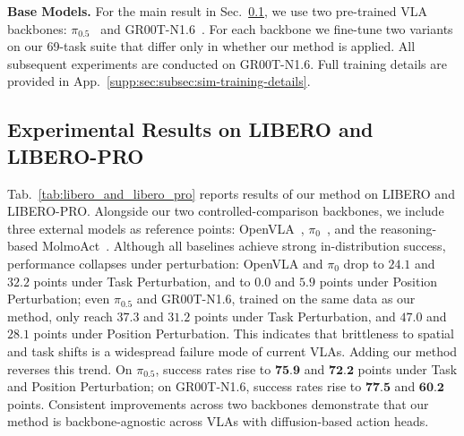 \noindent\textbf{Base Models.}
For the main result in Sec.~\ref{sec:libero_and_libero_pro}, we use two pre-trained VLA backbones:  $\pi_{0.5}$~\cite{pi05} and GR00T-N1.6~\cite{gr00tn1_2025}. For each backbone we fine-tune two variants on our 69-task suite that differ only in whether our method is applied. All subsequent experiments are conducted on GR00T-N1.6. Full training details are provided in App.~\ref{supp:sec:subsec:sim-training-details}.


\subsection{Experimental Results on LIBERO and LIBERO-PRO}
\label{sec:libero_and_libero_pro}


Tab.~\ref{tab:libero_and_libero_pro} reports results of our method on LIBERO and LIBERO-PRO. Alongside our two controlled-comparison backbones, we include three external models as reference points: OpenVLA~\cite{kim2024openvla}, $\pi_{0}$~\cite{pi0}, and the reasoning-based MolmoAct~\cite{molmoact2025}. Although all baselines achieve strong in-distribution success, performance collapses under perturbation: OpenVLA and $\pi_{0}$ drop to $24.1$ and $32.2$ points under Task Perturbation, and to $0.0$ and $5.9$ points under Position Perturbation; even $\pi_{0.5}$ and GR00T-N1.6, trained on the same data as our method, only reach $37.3$ and $31.2$ points under Task Perturbation, and $47.0$ and $28.1$ points under Position Perturbation. This indicates that brittleness to spatial and task shifts is a widespread failure mode of current VLAs. Adding our method reverses this trend. On $\pi_{0.5}$, success rates rise to $\textbf{75.9}$ and $\textbf{72.2}$ points under Task and Position Perturbation; on GR00T-N1.6, success rates rise to $\textbf{77.5}$ and $\textbf{60.2}$ points. Consistent improvements across two backbones demonstrate that our method is backbone-agnostic across VLAs with diffusion-based action heads. 

